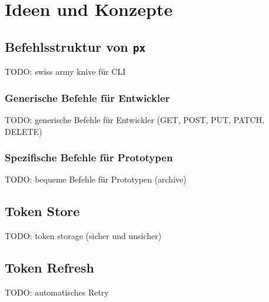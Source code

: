\section{Ideen und Konzepte}

\subsection{Befehlsstruktur von \texttt{px}}

TODO: swiss army knive \cite[p. 290]{gopl} für CLI

\subsubsection{Generische Befehle für Entwickler}

TODO: generische Befehle für Entwickler (GET, POST, PUT, PATCH, DELETE)

\subsubsection{Spezifische Befehle für Prototypen}

TODO: bequeme Befehle für Prototypen (archive)

\subsection{Token Store}

TODO: token storage (sicher und unsicher)

\subsection{Token Refresh}

TODO: automatisches Retry
